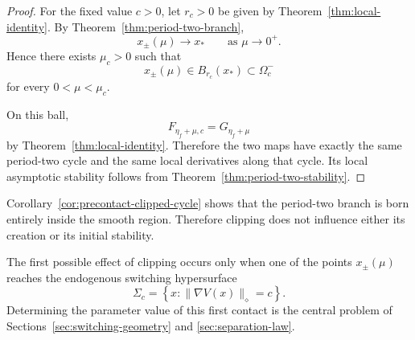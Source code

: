 \begin{proof}
For the fixed value $c>0$, let $r_c>0$ be given by
Theorem~\ref{thm:local-identity}. By
Theorem~\ref{thm:period-two-branch},
\[
x_\pm(\mu)\to x_*
\qquad
\text{as }\mu\to0^+.
\]
Hence there exists $\mu_c>0$ such that
\[
x_\pm(\mu)\in B_{r_c}(x_*)
\subset\Omega_c^-
\]
for every $0<\mu<\mu_c$.

On this ball,
\[
F_{\eta_f+\mu,c}
=
G_{\eta_f+\mu}
\]
by Theorem~\ref{thm:local-identity}. Therefore the two maps have
exactly the same period-two cycle and the same local derivatives
along that cycle.  Its local asymptotic stability follows from
Theorem~\ref{thm:period-two-stability}.
\end{proof}

\begin{remark}
\label{rem:first-clipping-effect}
Corollary~\ref{cor:precontact-clipped-cycle} shows that the
period-two branch is born entirely inside the smooth region.
Therefore clipping does not influence either its creation or its
initial stability.

The first possible effect of clipping occurs only when one of the
points $x_\pm(\mu)$ reaches the endogenous switching hypersurface
\[
\Sigma_c
=
\left\{
x:
\|\nabla V(x)\|_\diamond=c
\right\}.
\]
Determining the parameter value of this first contact is the central
problem of Sections~\ref{sec:switching-geometry} and
\ref{sec:separation-law}.
\end{remark}

